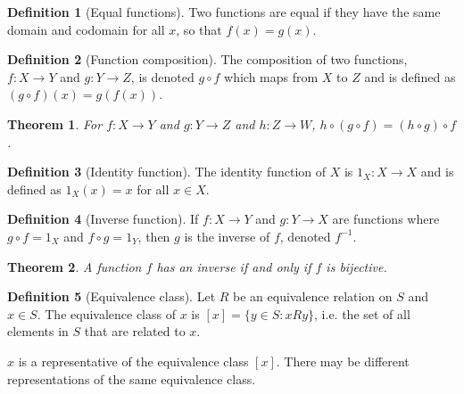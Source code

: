 \documentclass{article}
\theoremstyle{plain}
\newtheorem{theorem}{Theorem}[section]
\numberwithin{theorem}{section}
\theoremstyle{definition}
\newtheorem{definition}{Definition}[section]
\numberwithin{definition}{section}
\theoremstyle{remark}
\numberwithin{note}{section}
\begin{document}
%
\begin{definition}[Equal functions]
    Two functions are equal if they have the same domain and codomain
    for all $x$, so that $f(x) = g(x)$.
\end{definition}
%
\begin{definition}[Function composition]
    The composition of two functions, $f:X \to Y$ and $g:Y \to Z$,
    is denoted $g \circ f$ which maps from $X$ to $Z$ and is defined as
    $(g \circ f)(x) = g(f(x))$.
\end{definition}
%
\begin{theorem}
    For $f:X \to Y$ and $g:Y \to Z$ and  $h:Z \to W$,
    $h \circ (g \circ f) = (h \circ g) \circ f$.
\end{theorem}
%
\begin{definition}[Identity function]
    The identity function of $X$ is $1_X:X \to X$ and is defined as
    $1_X (x)=x$ for all $x \in X$.
\end{definition}
%
\begin{definition}[Inverse function]
    If $f:X \to Y$ and $g:Y \to X$ are functions where
    $g \circ f = 1_X$ and $f \circ g = 1_Y$,
    then $g$ is the inverse of $f$, denoted $f^{-1}$.
\end{definition}
%
\begin{theorem}
    A function $f$ has an inverse if and only if $f$ is bijective.
\end{theorem}
%
\begin{definition}[Equivalence class]
    Let $R$ be an equivalence relation on $S$ and $x \in S$.
    The equivalence class of $x$ is $[x] = \{y \in S : xRy\}$,
    i.e. the set of all elements in $S$ that are related to $x$.

    $x$ is a representative of the equivalence class $[x]$.
    There may be different representations of the same equivalence class.
\end{definition}
%
\end{document}
